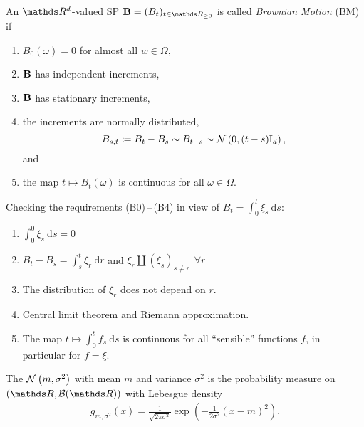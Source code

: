 \begin{defi}
An $\Rd$-valued SP $\B=(B_t)_{t \in \R_{\geq 0}}$
is called \emph{Brownian Motion} (BM) if
\begin{enumerate}[label=(B\arabic*)]
\item $B_0(\omega)=0$ for almost all $w\in \Omega$,
\item $\mathbf{B}$ has independent increments,
\item $\mathbf{B}$ has stationary increments,
\item the increments are normally distributed, \ie
	\[B_{s,t} \coloneqq B_t - B_s \sim B_{t-s}\sim \mathcal{N}\left(0,(t-s)\mathrm{I}_d\right),\]
	and
\item the map $t\mapsto B_t(\omega)$ is continuous for all $\omega \in \Omega$.
\end{enumerate}
\end{defi}

\begin{bem}
Checking the requirements (B0)\,--\,(B4)
in view of $B_t=\int_0^t \xi_s~\mathrm{d}s$:
\begin{enumerate}[label=(B\arabic*)]
\item $\int_0^0\xi_s~\mathrm{d}s=0$
\item $B_t-B_s=\int_s^t \xi_r~\mathrm{d}r$
	and $\xi_r \amalg (\xi_s)_{s\not =r}~~\forall r$
\item The distribution of $\xi_r$ does not depend on $r$.
\item Central limit theorem and Riemann approximation.
\item The map $t \mapsto \int_0^t f_s~\mathrm{d}s$ is continuous
	for all “sensible” functions $f$,
	in particular for $f = \xi$.
\end{enumerate}
\end{bem}

\begin{defi}
The  $\mathcal{N}\left(m,\sigma^2\right)$
with mean $m$ and variance $\sigma^2$ is
the probability measure on $(\R,\mathcal{B}(\R))$ with Lebesgue density
\begin{align*}
	g_{m, \sigma^2}(x) = \frac{1}{\sqrt{2\pi \sigma^2}} \exp\left(-\frac{1}{2\sigma^2}(x-m)^2\right).
\end{align*}
\end{defi}

